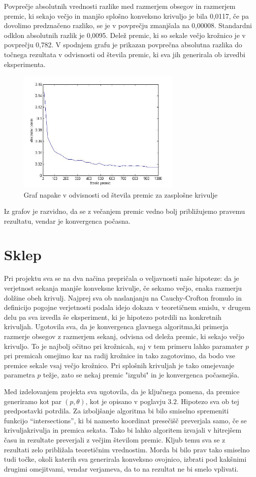 \documentclass[a4paper]{article}
\begin{document}
Povprečje absolutnih vrednosti razlike med razmerjem obsegov in razmerjem premic, ki sekajo večjo in manjšo splošno konveksno krivuljo je bila 0,0117, če pa dovolimo predznačeno razliko, se je v povprečju zmanjšala na 0,00008. Standardni odklon absolutnih razlik je 0,0095. Delež premic, ki so sekale večjo krožnico je v povprečju 0,782. V spodnjem grafu je prikazan povprečna absolutna razlika do točnega rezultata v odvisnosti od števila premic, ki sva jih generirala ob izvedbi eksperimenta.

\begin{figure}[h]
\centering
\includegraphics[width=80mm]{graf_splosna.jpg}
\caption{Graf napake v odvisnosti od števila premic za zasplošne krivulje \label{overflow}}
\end{figure} 

Iz grafov je razvidno, da se z večanjem premic vedno bolj približujemo pravemu rezultatu, vendar je konvergenca počasna. 

\section{Sklep}
Pri projektu sva se na dva načina prepričala o veljavnosti naše hipoteze: da je verjetnost sekanja manjše konveksne krivulje, če sekamo večjo, enaka razmerju dolžine obeh krivulj. Najprej sva ob naslanjanju na Cauchy-Crofton fromulo in definicijo pogojne verjetnosti podala idejo dokaza v teoretičnem smislu, v drugem delu pa sva izvedla še eksperiment, ki je hipotezo potrdili na konkretnih krivuljah. 
Ugotovila sva, da je konvergenca glavnega algoritma,ki primerja razmerje obsegov z razmerjem sekanj, odvisna od deleža premic, ki sekajo večjo krivuljo. To je najbolj očitno pri krožnicah, saj v tem primeru lahko paramater $p$ pri premicah omejimo kar na radij krožnice in tako zagotovimo, da bodo vse premice sekale vsaj večjo krožnico. Pri splošnih krivuljah je tako omejevanje parametra $p$ težje, zato se nekaj premic "izgubi" in je konvergenca počasnejša. 

Med izdelovanjem projekta sva ugotovila, da je ključnega pomena, da premice generiramo kot par $(p, \theta)$, kot je opisano v poglavju $3.2$. Hipotezo sva ob tej predpostavki potrdila. Za izboljšanje algoritma bi bilo smiselno spremeniti funkcijo ``intersections'', ki bi namesto koordinat presečišč preverjala samo, če se krivuljakrivulja in premica sekata. Tako bi lahko algoritem izvajali v hitrejšem času in rezultate preverjali z večjim številom premic. Kljub temu sva se z rezultati zelo približala teoretičnim vrednostim. Morda bi bilo prav tako smiselno tudi točke, okoli katerih sva generirala konveksno ovojnico, izbrati pod kakšnimi drugimi omejitvami, vendar verjameva, da to na rezultat ne bi smelo vplivati.
\end{document}
